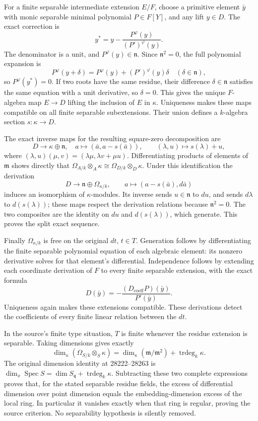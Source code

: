 For a finite separable intermediate extension \(E/F\), choose a primitive element \(\bar y\) with monic separable minimal polynomial \(P\in F[Y]\), and any lift \(y\in D\). The exact correction is \[
y^*=y-\frac{P^\varphi(y)}{(P')^\varphi(y)}.
\] The denominator is a unit, and \(P^\varphi(y)\in\mathfrak n\). Since \(\mathfrak n^2=0\), the full polynomial expansion is \[
P^\varphi(y+\delta)=P^\varphi(y)+(P')^\varphi(y)\delta
\quad(\delta\in\mathfrak n),
\] so \(P^\varphi(y^*)=0\). If two roots have the same residue, their difference \(\delta\in\mathfrak n\) satisfies the same equation with a unit derivative, so \(\delta=0\). This gives the unique \(F\)-algebra map \(E\to D\) lifting the inclusion of \(E\) in \(\kappa\). Uniqueness makes these maps compatible on all finite separable subextensions. Their union defines a \(k\)-algebra section \(s:\kappa\to D\).

The exact inverse maps for the resulting square-zero decomposition are \[
D\longrightarrow\kappa\oplus\mathfrak n,\quad
a\longmapsto(\bar a,a-s(\bar a)),\qquad
(\lambda,u)\longmapsto s(\lambda)+u,
\] where \((\lambda,u)(\mu,v)=(\lambda\mu,\lambda v+\mu u)\). Differentiating products of elements of \(\mathfrak m\) shows directly that \(\Omega_{A/k}\otimes_A\kappa\cong\Omega_{D/k}\otimes_D\kappa\). Under this identification the derivation \[
D\longrightarrow\mathfrak n\oplus\Omega_{\kappa/k},\qquad
a\longmapsto(a-s(\bar a),d\bar a)
\] induces an isomorphism of \(\kappa\)-modules. Its inverse sends \(u\in\mathfrak n\) to \(du\), and sends \(d\lambda\) to \(d(s(\lambda))\); these maps respect the derivation relations because \(\mathfrak n^2=0\). The two composites are the identity on \(du\) and \(d(s(\lambda))\), which generate. This proves the split exact sequence.

Finally \(\Omega_{\kappa/k}\) is free on the original \(dt\), \(t\in T\). Generation follows by differentiating the finite separable polynomial equation of each algebraic element: its nonzero derivative solves for that element's differential. Independence follows by extending each coordinate derivation of \(F\) to every finite separable extension, with the exact formula \[
D(\bar y)=-\frac{(D_{\mathrm{coeff}}P)(\bar y)}{P'(\bar y)}.
\] Uniqueness again makes these extensions compatible. These derivations detect the coefficients of every finite linear relation between the \(dt\).

In the source's finite type situation, \(T\) is finite whenever the residue extension is separable. Taking dimensions gives exactly \[
\dim_\kappa(\Omega_{S/k}\otimes_S\kappa)
=\dim_\kappa(\mathfrak m/\mathfrak m^2)+\operatorname{trdeg}_k\kappa.
\] The original dimension identity at 28222--28263 is \(\dim_x\operatorname{Spec}S=\dim S_{\mathfrak q}+\operatorname{trdeg}_k\kappa\). Subtracting these two complete expressions proves that, for the stated separable residue fields, the excess of differential dimension over point dimension equals the embedding-dimension excess of the local ring. In particular it vanishes exactly when that ring is regular, proving the source criterion. No separability hypothesis is silently removed.

